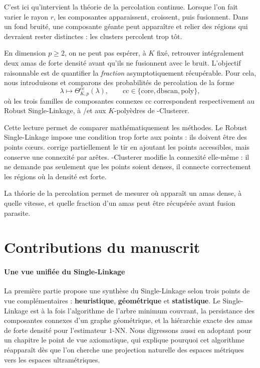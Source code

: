 C'est ici qu'intervient la théorie de la percolation continue. 
Lorsque l'on fait varier le rayon $r$, les composantes apparaissent, croissent, puis fusionnent.
Dans un fond bruité, une composante géante peut apparaître et relier des régions qui devraient rester distinctes : %
les clusters percolent trop tôt.

En dimension $p\geq2$, on ne peut pas espérer, à $K$ fixé, retrouver intégralement deux amas de forte densité avant qu'ils ne fusionnent avec le bruit. 
L'objectif raisonnable est de quantifier la \emph{fraction} asymptotiquement récupérable. Pour cela, nous introduisons et comparons des probabilités de percolation de la forme
\[
    \lambda
    \longmapsto
    \Theta^{\mathrm{cc}}_{K,p}(\lambda),
    \qquad
    \mathrm{cc}\in
    \{\mathrm{core},\mathrm{dbscan},\mathrm{poly}\},
\]
où les trois familles de composantes connexes $\mathrm{cc}$ correspondent respectivement au Robust Single-Linkage, à \DBSCAN/\HDBSCAN et aux $K$-polyèdres de \HGP-Clusterer.

Cette lecture permet de comparer mathématiquement les méthodes. Le Robust Single-Linkage impose une condition trop forte aux points : ils doivent être des points cœurs. 
\DBSCAN corrige partiellement le tir en ajoutant les points accessibles, mais conserve une connexité par arêtes. 
\HGP-Clusterer modifie la connexité elle-même : il ne demande pas seulement que les points soient denses, il connecte correctement les régions où la densité \KNN est forte.

La théorie de la percolation permet de mesurer où apparaît un amas dense, à quelle vitesse, et quelle fraction d'un amas peut être récupérée avant fusion parasite. 

\section{Contributions du manuscrit}


\paragraph{Une vue unifiée du Single-Linkage}
La première partie propose une synthèse du Single-Linkage selon trois points de vue complémentaires : \textbf{heuristique}, \textbf{géométrique} et \textbf{statistique}.
Le Single-Linkage est à la fois l'algorithme de l'arbre minimum couvrant, la persistance des composantes connexes d'un graphe géométrique, et la hiérarchie exacte des amas de forte densité pour l'estimateur $1$-NN. 
Nous digressons aussi en adoptant pour un chapitre le point de vue axiomatique, qui explique pourquoi cet algorithme réapparaît dès que l'on cherche une projection naturelle des espaces métriques vers les espaces ultramétriques.

